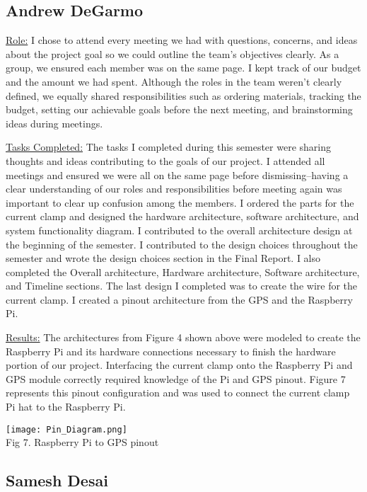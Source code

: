 \subsection{Andrew DeGarmo}
\underline{Role:} I chose to attend every meeting we had with questions, concerns, and ideas about the project goal so we could outline the team’s objectives clearly. 
As a group, we ensured each member was on the same page. 
I kept track of our budget and the amount we had spent. 
Although the roles in the team weren’t clearly defined, we equally shared responsibilities such as ordering materials, tracking the budget, setting our achievable goals before the next meeting, and brainstorming ideas during meetings.

\underline{Tasks Completed:} The tasks I completed during this semester were sharing thoughts and ideas contributing to the goals of our project. 
I attended all meetings and ensured we were all on the same page before dismissing–having a clear understanding of our roles and responsibilities before meeting again was important to clear up confusion among the members. 
I ordered the parts for the current clamp and designed the hardware architecture, software architecture, and system functionality diagram. 
I contributed to the overall architecture design at the beginning of the semester. 
I contributed to the design choices throughout the semester and wrote the design choices section in the Final Report. 
I also completed the Overall architecture, Hardware architecture, Software architecture, and Timeline sections. 
The last design I completed was to create the wire for the current clamp. 
I created a pinout architecture from the GPS and the Raspberry Pi.

\underline{Results:} The architectures from Figure 4 shown above were modeled to create the Raspberry Pi and its hardware connections necessary to finish the hardware portion of our project. 
Interfacing the current clamp onto the Raspberry Pi and GPS module correctly required knowledge of the Pi and GPS pinout. 
Figure 7 represents this pinout configuration and was used to connect the current clamp Pi hat to the Raspberry Pi.

\begin{center}
    \texttt{[image: Pin\_Diagram.png]}\\
    Fig 7. Raspberry Pi to GPS pinout
\end{center}

\subsection{Samesh Desai}

